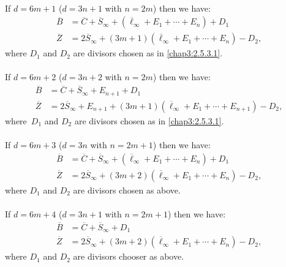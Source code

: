 \paragraph{}\label{chap3:2.5.3.2}
If $d=6m+1$ (\iec $d=3n+1$ with $n=2m$) then we have:
\begin{align*}
\overline{B} &=
\overline{C}+\overline{S}_{\infty}+(\overline{\ell}_{\infty}+E_{1}+\cdots+E_{n})+D_{1}\\
\overline{Z} &= 2\overline{S}_{\infty}+(3m+1)(\overline{\ell}_{\infty}+E_{1}+\cdots+E_{n})-D_{2},
\end{align*}
where $D_{1}$ and $D_{2}$ are divisors chosen as in \ref{chap3:2.5.3.1}.

\paragraph{}\label{chap3:2.5.3.3}
If $d=6m+2$ (\iec $d=3n+2$ with $n=2m$) then we have:
\begin{align*}
\overline{B} &= \overline{C}+\overline{S}_{\infty}+E_{n+1}+D_{1}\\
\overline{Z} &=
2\overline{S}_{\infty}+E_{n+1}+(3m+1)(\overline{\ell}_{\infty}+E_{1}+\cdots+E_{n+1})-D_{2}, 
\end{align*}
where\pageoriginale\ $D_{1}$ and $D_{2}$ are divisors chosen as in
\ref{chap3:2.5.3.1}.

\paragraph{}\label{chap3:2.5.3.4}
If $d=6m+3$ (\iec $d=3n$ with $n=2m+1$) then we have:
\begin{align*}
\overline{B} &=
\overline{C}+\overline{S}_{\infty}+(\overline{\ell}_{\infty}+E_{1}+\cdots+E_{n})+D_{1}\\
\overline{Z} &= 2\overline{S}_{\infty}+(3m+2)(\overline{\ell}_{\infty}+E_{1}+\cdots+E_{n})-D_{2},
\end{align*}
where $D_{1}$ and $D_{2}$ are divisors chosen as above.

\paragraph{}\label{chap3:2.5.3.5}
If $d=6m+4$ (\iec $d=3n+1$ with $n=2m+1$) then we have:
\begin{align*}
\overline{B} &= \overline{C}+\overline{S}_{\infty}+D_{1}\\
\overline{Z} &=
2\overline{S}_{\infty}+(3m+2)(\overline{\ell}_{\infty}+E_{1}+\cdots+E_{n})-D_{2}, 
\end{align*}
where $D_{1}$ and $D_{2}$ are divisors chooser as above.

